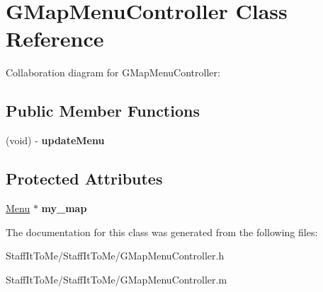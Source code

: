 \hypertarget{interface_g_map_menu_controller}{
\section{\-G\-Map\-Menu\-Controller \-Class \-Reference}
\label{interface_g_map_menu_controller}
}


\-Collaboration diagram for \-G\-Map\-Menu\-Controller\-:
\subsection*{\-Public \-Member \-Functions}
\begin{DoxyCompactItemize}
\item 
\hypertarget{interface_g_map_menu_controller_a6772f0b7c19f05401ed919b3ac1c6568}{
(void) -\/ {\bfseries update\-Menu}}
\label{interface_g_map_menu_controller_a6772f0b7c19f05401ed919b3ac1c6568}

\end{DoxyCompactItemize}
\subsection*{\-Protected \-Attributes}
\begin{DoxyCompactItemize}
\item 
\hypertarget{interface_g_map_menu_controller_a15af9b2a9025e64c5429a10ca2c08a2a}{
\hyperlink{interface_menu}{\-Menu} $\ast$ {\bfseries my\-\_\-map}}
\label{interface_g_map_menu_controller_a15af9b2a9025e64c5429a10ca2c08a2a}

\end{DoxyCompactItemize}


\-The documentation for this class was generated from the following files\-:\begin{DoxyCompactItemize}
\item 
\-Staff\-It\-To\-Me/\-Staff\-It\-To\-Me/\-G\-Map\-Menu\-Controller.\-h\item 
\-Staff\-It\-To\-Me/\-Staff\-It\-To\-Me/\-G\-Map\-Menu\-Controller.\-m\end{DoxyCompactItemize}
